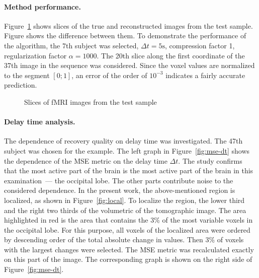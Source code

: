 \documentclass{article}
\begin{document}
\paragraph*{Method performance.}

Figure~\ref*{fig:example} shows slices of the true and reconstructed images from the test sample.
Figure shows the difference between them.
To demonstrate the performance of the algorithm, the 7th subject was selected, $\Delta t = 5 \text{s}$, compression factor 1, regularization factor
$\alpha = 1000$. The 20th slice along the first coordinate of the 37th image in the sequence was considered.
Since the voxel values are normalized to the segment $[0; 1]$, an error of the order of $10^{-3}$
indicates a fairly accurate prediction.

\begin{figure}[h!]
	\centering
	\hfill
	\hfill
	\caption{Slices of fMRI images from the test sample}
	\label{fig:example}
\end{figure}

\paragraph*{Delay time analysis.}

The dependence of recovery quality on delay time was investigated.
The 47th subject was chosen for the example.
The left graph in Figure~\ref{fig:mse-dt} shows the dependence of the MSE metric
on the delay time $\Delta t$.
The study confirms that the most active part of the brain is the most active part of the brain 
in this examination~--- the occipital lobe.
The other parts contribute noise to the considered dependence.
In the present work, the above-mentioned region is localized, 
as shown in Figure~\ref{fig:local}.
To localize the region, the lower third and the right two thirds of the volumetric
of the tomographic image.
The area highlighted in red is the area that contains the 3\% 
of the most variable voxels in the occipital lobe.
For this purpose, all voxels of the localized area were ordered by 
descending order of the total absolute change in values.
Then 3\% of voxels with the largest changes were selected.
The MSE metric was recalculated exactly on this part of the image.
The corresponding graph is shown on the right side of Figure~\ref{fig:mse-dt}.
\end{document}

